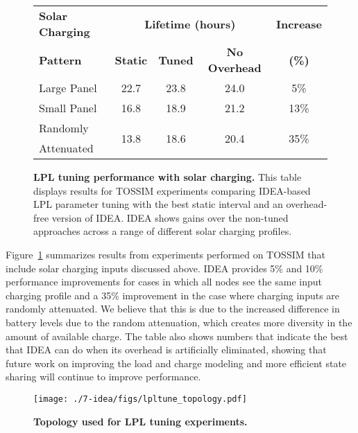 \begin{figure}[t]
\begin{small}
\begin{center}
\begin{tabular}{|l|cccc|}
\hline
\textbf{Solar Charging} & \multicolumn{3}{c}{\textbf{Lifetime (hours)}} &
\textbf{Increase} \\
\textbf{Pattern} & \textbf{Static} & \textbf{Tuned} & \textbf{No Overhead} & \textbf{(\%)} \\ \hline
Large Panel & 22.7 & 23.8 & 24.0 & 5\% \\
Small Panel & 16.8 & 18.9 & 21.2 & 13\% \\
Randomly & \multirow{2}{*}{13.8} & \multirow{2}{*}{18.6} & \multirow{2}{*}{20.4} & \multirow{2}{*}{35\%} \\
Attenuated & & & & \\ \hline
\end{tabular}
\end{center}
\end{small}
\caption{\small{\textbf{LPL tuning performance with solar charging.}
This table displays results for TOSSIM experiments comparing IDEA-based LPL
parameter tuning with the best static interval and an overhead-free
version of IDEA. IDEA shows gains over the non-tuned approaches
across a range of different solar charging profiles.}}
\label{table-lplvoptimaltossim}
\end{figure}

Figure~\ref{table-lplvoptimaltossim} summarizes results from experiments
performed on TOSSIM that include solar charging inputs discussed above.  IDEA
provides 5\% and 10\% performance improvements for cases in which all nodes
see the same input charging profile and a 35\% improvement in the case where
charging inputs are randomly attenuated. We believe that this is due to the
increased difference in battery levels due to the random attenuation, which
creates more diversity in the amount of available charge. The table also
shows numbers that indicate the best that IDEA can do when its overhead is
artificially eliminated, showing that future work on improving the load and
charge modeling and more efficient state sharing will continue to improve
performance.

\begin{figure}[t]
\begin{center}
\texttt{[image: ./7-idea/figs/lpltune\_topology.pdf]}
\end{center}
\caption{\small{\textbf{Topology used for LPL tuning experiments.}}}
\label{fig-lpltopology}
\end{figure}

